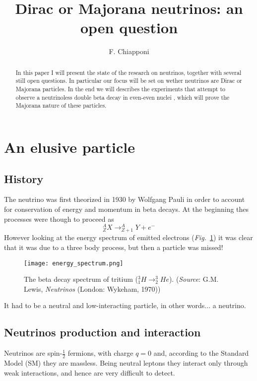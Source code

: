 \documentclass{subnucbo}
\begin{document}
\title{Dirac or Majorana neutrinos: an open question}

\author{F. Chiapponi} 



\maketitle

\begin{abstract}
In this paper I will present the state of the research on neutrinos, together with several still open questions. In particular our focus will be set on wether neutrinos are Dirac or Majorana particles. In the end we will describes the experiments that attempt to observe a neutrinoless double beta decay in even-even nuclei%
, which will prove the Majorana nature of these particles.
\end{abstract}

\section{An elusive particle}
\subsection{History}
The neutrino was first theorized in 1930 by Wolfgang Pauli in order to account for conservation of energy and momentum in beta decays.
At the beginning thes processes were though to proceed as
\[
^A_Z X\rightarrow ^A_{Z+1}Y+e^-
\]
However looking at the energy spectrum of emitted electrons (\emph{Fig.}~\ref{fig:betaD}) it was clear that it was due to a three body process, but then a particle was missed!

\begin{figure}
\centering
\texttt{[image: energy\_spectrum.png]}
\caption{The beta decay spectrum of tritium ($^3_1H\rightarrow ^3_2He$). (\emph{Source}: G.M. Lewis, \emph{Neutrinos} (London: Wykeham, 1970))}
\label{fig:betaD}
\end{figure}

It had to be a neutral and low-interacting particle, in other words... a neutrino.

\subsection{Neutrinos production and interaction}
Neutrinos are spin-$\frac{1}{2}$ fermions, with charge $q=0$  and, according to the Standard Model (SM) they are massless. Being neutral leptons they interact only through weak interactions, and hence are very difficult to detect.
\end{document}
